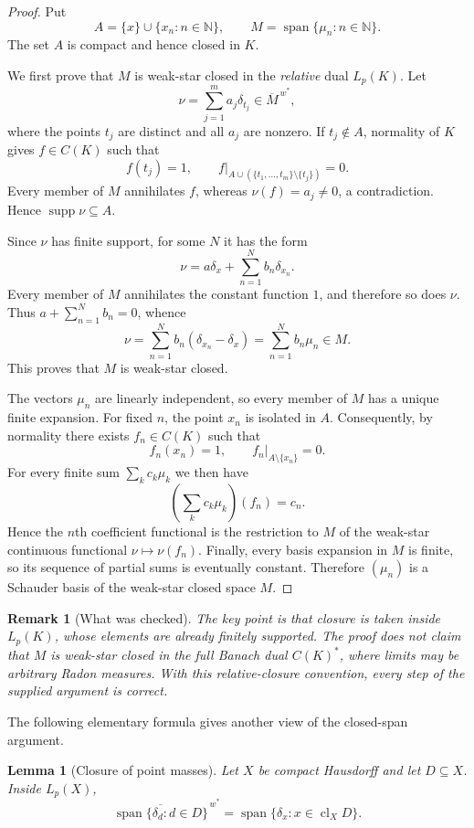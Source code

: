 \documentclass[11pt]{article}
\newtheorem{lemma}[theorem]{Lemma}
\newtheorem{remark}[theorem]{Remark}
\newcommand{\Lp}{L_p}
\newcommand{\wstar}{w^*}
\newcommand{\supp}{\operatorname{supp}}
\newcommand{\spann}{\operatorname{span}}
\newcommand{\cl}{\operatorname{cl}}
\newcommand{\N}{\mathbb{N}}
\begin{document}
\begin{proof}
Put
\[
 A=\{x\}\cup\{x_n:n\in\N\},\qquad
 M=\spann\{\mu_n:n\in\N\}.
\]
The set $A$ is compact and hence closed in $K$.

We first prove that $M$ is weak-star closed in the \emph{relative} dual
$\Lp(K)$.  Let
\[
 \nu=\sum_{j=1}^m a_j\delta_{t_j}\in\overline M^{\,\wstar},
\]
where the points $t_j$ are distinct and all $a_j$ are nonzero.  If
$t_j\notin A$, normality of $K$ gives $f\in C(K)$ such that
\[
 f(t_j)=1,\qquad
 f\big|_{A\cup(\{t_1,\ldots,t_m\}\setminus\{t_j\})}=0.
\]
Every member of $M$ annihilates $f$, whereas $\nu(f)=a_j\neq0$, a
contradiction.  Hence $\supp\nu\subseteq A$.

Since $\nu$ has finite support, for some $N$ it has the form
\[
 \nu=a\delta_x+\sum_{n=1}^N b_n\delta_{x_n}.
\]
Every member of $M$ annihilates the constant function $1$, and therefore so
does $\nu$.  Thus $a+\sum_{n=1}^N b_n=0$, whence
\[
 \nu=\sum_{n=1}^N b_n(\delta_{x_n}-\delta_x)
     =\sum_{n=1}^N b_n\mu_n\in M.
\]
This proves that $M$ is weak-star closed.

The vectors $\mu_n$ are linearly independent, so every member of $M$ has a
unique finite expansion.  For fixed $n$, the point $x_n$ is isolated in $A$.
Consequently, by normality there exists $f_n\in C(K)$ such that
\[
 f_n(x_n)=1,\qquad f_n\big|_{A\setminus\{x_n\}}=0.
\]
For every finite sum $\sum_k c_k\mu_k$ we then have
\[
 \left(\sum_k c_k\mu_k\right)(f_n)=c_n.
\]
Hence the $n$th coefficient functional is the restriction to $M$ of the
weak-star continuous functional $\nu\mapsto\nu(f_n)$.  Finally, every basis
expansion in $M$ is finite, so its sequence of partial sums is eventually
constant.  Therefore $(\mu_n)$ is a Schauder basis of the weak-star closed
space $M$.
\end{proof}

\begin{remark}[What was checked]
The key point is that closure is taken inside $\Lp(K)$, whose elements are
already finitely supported.  The proof does not claim that $M$ is weak-star
closed in the full Banach dual $C(K)^*$, where limits may be arbitrary Radon
measures.  With this relative-closure convention, every step of the supplied
argument is correct.
\end{remark}

The following elementary formula gives another view of the closed-span
argument.

\begin{lemma}[Closure of point masses]\label{lem:point-closure}
Let $X$ be compact Hausdorff and let $D\subseteq X$.  Inside $\Lp(X)$,
\[
 \overline{\spann\{\delta_d:d\in D\}}^{\,\wstar}
 =\spann\{\delta_x:x\in\cl_X D\}.
\]
\end{lemma}
\end{document}
